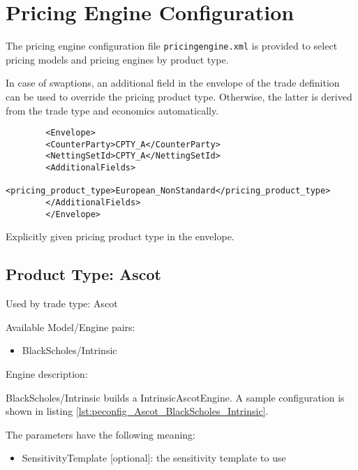 \section{Pricing Engine Configuration}
\label{sec:configuration_pricingengines}

The pricing engine configuration file {\tt pricingengine.xml} is provided to select pricing models and
pricing engines by product type.

In case of swaptions, an additional field in the envelope of the trade definition can be used to override the pricing product type.
Otherwise, the latter is derived from the trade type and economics automatically.

\begin{longlisting}
    \begin{verbatim}
        <Envelope>
        <CounterParty>CPTY_A</CounterParty>
        <NettingSetId>CPTY_A</NettingSetId>
        <AdditionalFields>
            <pricing_product_type>European_NonStandard</pricing_product_type>
        </AdditionalFields>
        </Envelope>
    \end{verbatim}
    \caption{Explicitly given pricing product type in the envelope.}
\end{longlisting}

\subsection{Product Type: Ascot}

Used by trade type: Ascot

Available Model/Engine pairs:

\begin{itemize}
\item BlackScholes/Intrinsic
\end{itemize}

Engine description:

BlackScholes/Intrinsic builds a IntrinsicAscotEngine. A sample configuration is shown
in listing \ref{lst:peconfig_Ascot_BlackScholes_Intrinsic}.

The parameters have the following meaning:

\begin{itemize}
\item SensitivityTemplate [optional]: the sensitivity template to use 
\end{itemize}

